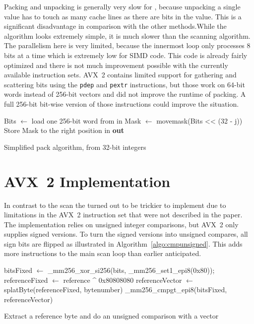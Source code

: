 Packing and unpacking is generally very slow for \bwv{}, because unpacking a
single value has to touch as many cache lines as there are bits in the value.
This is a significant disadvantage in comparison with the other methods.While
the algorithm looks extremely simple, it is much slower than the scanning
algorithm.  The parallelism here is very limited, because the innermost loop only
processes 8 bits at a time which is extremely low for SIMD code. This code is
already fairly optimized and there is not much improvement possible with the
currently available instruction sets. AVX~2 contains limited support for
gathering and scattering bits using the \texttt{pdep} and \texttt{pextr}
instructions, but those work on 64-bit words instead of 256-bit vectors and did
not improve the runtime of packing. A full 256-bit bit-wise version of those
instructions could improve the situation.

\begin{algorithm}[h]
\begin{algorithmic}[1]
      \State Bits $\gets$ load one 256-bit word from in
        \State Mask $\gets$ movemask(Bits << (32 - j)) 
        \State Store Mask to the right position in \textbf{out}
      \EndFor
    \EndFor
  \EndFor
  \EndProcedure
\end{algorithmic}
\caption{Simplified \bwv{} pack algorithm, from 32-bit integers}
\label{algo:packbwv}
\end{algorithm}

\section{AVX~2 \bs{} Implementation}

In contrast to the \bwv{} scan the \bs{} turned out to be trickier to implement
due to limitations in the AVX~2 instruction set that were not described in the
\bs{} paper. The implementation relies on unsigned integer comparisons, but AVX~2
only supplies signed versions. To turn the signed versions into unsigned
compares, all sign bits are flipped as illustrated in
Algorithm~\ref{algo:cmpunsigned}. This adds more instructions to the main scan
loop than earlier anticipated.

\begin{algorithm}[h]
\begin{algorithmic}[1]
  \State bitsFixed $\gets$ \_mm256\_xor\_si256(bits, \_mm256\_set1\_epi8(0x80));
  \State referenceFixed $\gets$ reference \^{} 0x80808080
  \State referenceVector $\gets$ splatByte(referenceFixed, bytenumber)
  \State \Return \_mm256\_cmpgt\_epi8(bitsFixed, referenceVector)
  \EndProcedure
\end{algorithmic}
\caption{Extract a reference byte and do an unsigned comparison with a vector}
\label{algo:cmpunsigned}
\end{algorithm}

